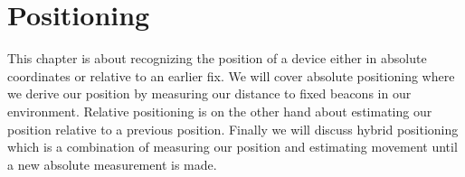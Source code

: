 \chapter{Positioning} \label{ch:positioning}
This chapter is about recognizing the position of a device either in absolute coordinates or relative to an earlier fix. We will cover absolute positioning where we derive our position by measuring our distance to fixed beacons in our environment. Relative positioning is on the other hand about estimating our position relative to a previous position. Finally we will discuss hybrid positioning which is a combination of measuring our position and estimating movement until a new absolute measurement is made.



